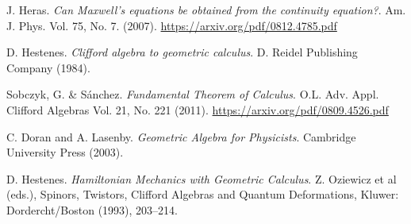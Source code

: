\documentclass{article}
\begin{document}


  \begin{thebibliography}{9} 

      J. Heras.
      \emph{Can Maxwell’s equations be obtained from the continuity equation?}.
      Am. J. Phys. Vol. 75, No. 7. (2007).
      \url{https://arxiv.org/pdf/0812.4785.pdf}


      D. Hestenes.
      \emph{Clifford algebra to geometric calculus}.
      D. Reidel Publishing Company (1984).

      Sobczyk, G. \& S\'anchez.
      \emph{Fundamental Theorem of Calculus}.
      O.L. Adv. Appl. Clifford Algebras Vol. 21, No. 221 (2011).
      \url{https://arxiv.org/pdf/0809.4526.pdf}

      C. Doran and A. Lasenby.
      \emph{Geometric Algebra for Physicists}. Cambridge University Press (2003).




      D. Hestenes.
      \emph{Hamiltonian Mechanics with Geometric Calculus}.
       Z. Oziewicz et al (eds.), Spinors, Twistors, Clifford Algebras and Quantum Deformations, Kluwer: Dordercht/Boston (1993), 203–214.


  \end{thebibliography}
\end{document}
